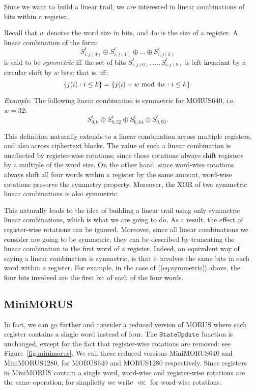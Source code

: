 \documentclass{llncs}
\newcommand{\cipher}[1]{\textsf{#1}}
\newcommand\StateUpdate{\ensuremath{\texttt{StateUpdate}}}
\begin{document}
Since we want to build a linear trail, we are interested in linear combinations of bits within a register.
\begin{definition}
Recall that $w$ denotes the word size in bits, and $4w$ is the size of a register. A linear combination of the form:
\[
S^t_{i,j(0)} \oplus S^t_{i,j(1)} \oplus \dots \oplus S^t_{i,j(k)}
\]
is said to be \emph{symmetric} iff the set of bits $S^t_{i,j(0)}, \dots, S^t_{i,j(k)}$ is left invariant by a circular shift by $w$ bits; that is, iff:
\[
\{j(i) : i\leq k\} = \{j(i) + w \text{\rm{} mod } 4w : i\leq k\}.
\]
\end{definition}
\emph{Example.} The following linear combination is symmetric for \cipher{MORUS640}, i.e. $w = 32$:
\begin{equation}
S^t_{0,0} \oplus S^t_{0,32} \oplus S^t_{0,64} \oplus S^t_{0,96}.
\label{eq:symmetric}
\end{equation}

This definition naturally extends to a linear combination across multiple registers, and also across ciphertext blocks.
The value of such a linear combination is unaffected by register-wise rotations, since those rotations always shift registers by a multiple of the word size.
On the other hand, since word-wise rotations always shift all four words within a register by the same amount, word-wise rotations preserve the symmetry property. Moreover, the XOR of two symmetric linear combinations is also symmetric.%

This naturally leads to the idea of building a linear trail using only symmetric linear combinations, which is what we are going to do. As a result, the effect of register-wise rotations can be ignored. Moreover, since all linear combinations we consider are going to be symmetric, they can be described by truncating the linear combination to the first word of a register. Indeed, an equivalent way of saying a linear combination is symmetric, is that it involves the same bits in each word within a register. For example, in the case of (\ref{eq:symmetric}) above, the four bits involved are the first bit of each of the four words.

\subsection{\cipher{MiniMORUS}}

In fact, we can go further and consider a reduced version of \cipher{MORUS} where each register contains a single word instead of four. The \StateUpdate{} function is unchanged, except for the fact that register-wise rotations are removed: see Figure~\ref{fig:minimorus}. We call these reduced versions \cipher{MiniMORUS640} and \cipher{MiniMORUS1280}, for \cipher{MORUS640} and \cipher{MORUS1280} respectively. Since registers in \cipher{MiniMORUS} contain a single word, word-wise and register-wise rotations are the same operation; for simplicity we write $\lll$ for word-wise rotations.
\end{document}
